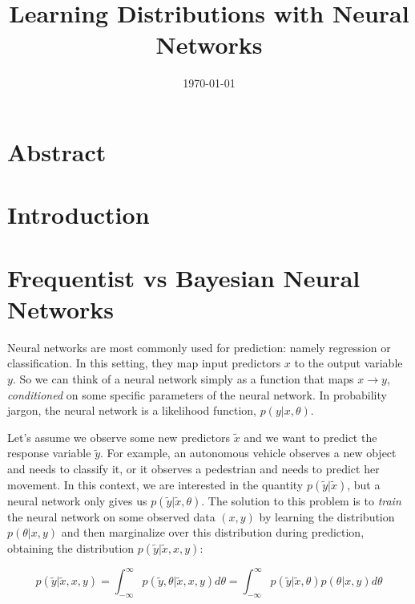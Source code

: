 \documentclass[12pt]{article}
\title{Learning Distributions with Neural Networks}
\author{}
\date{\today}
\begin{document}
\maketitle

\section{Abstract}

\section{Introduction}

\section{Frequentist vs Bayesian Neural Networks}
\label{sec_nn_vs_bnn}

Neural networks are most commonly used for prediction: namely regression or classification. In this setting, they map input predictors $x$ to the output variable $y$. So we can think of a neural network simply as a function that maps $x \rightarrow y$, \textit{conditioned} on some specific parameters of the neural network. In probability jargon, the neural network is a likelihood function, $p(y | x, \theta)$.

Let's assume we observe some new predictors $\tilde{x}$ and we want to predict the response variable $\tilde{y}$. For example, an autonomous vehicle observes a new object and needs to classify it, or it observes a pedestrian and needs to predict her movement. In this context, we are interested in the quantity $p(\tilde{y} | \tilde{x})$, but a neural network only gives us $p(\tilde{y} | \tilde{x}, \theta)$. The solution to this problem is to \textit{train} the neural network on some observed data $(x, y)$ by learning the distribution $p(\theta | x, y)$ and then marginalize over this distribution during prediction, obtaining the distribution $p(\tilde{y} | \tilde{x}, x, y)$:

\begin{equation}
p(\tilde{y} | \tilde{x}, x, y) = \int_{-\infty}^\infty p(\tilde{y}, \theta | \tilde{x}, x, y) d\theta =   \int_{-\infty}^\infty p(\tilde{y} | \tilde{x}, \theta) p(\theta | x, y) d\theta
\label{eq_post_pred}
\end{equation}
\end{document}
